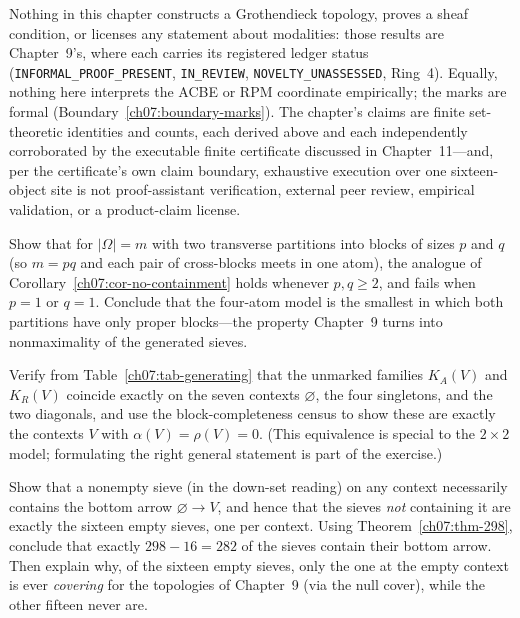 \begin{boundary}\label{ch07:boundary-scope}
Nothing in this chapter constructs a Grothendieck topology, proves a sheaf condition, or licenses any statement about modalities: those results are Chapter~9's, where each carries its registered ledger status (\texttt{INFORMAL\_PROOF\_PRESENT}, \texttt{IN\_REVIEW}, \texttt{NOVELTY\_UNASSESSED}, Ring~4). Equally, nothing here interprets the ACBE or RPM coordinate empirically; the marks are formal (Boundary~\ref{ch07:boundary-marks}). The chapter's claims are finite set-theoretic identities and counts, each derived above and each independently corroborated by the executable finite certificate discussed in Chapter~11---and, per the certificate's own claim boundary, exhaustive execution over one sixteen-object site is not proof-assistant verification, external peer review, empirical validation, or a product-claim license.
\end{boundary}

\begin{exercise}\label{ch07:ex-1}
Show that for $|\Omega|=m$ with two transverse partitions into blocks of sizes $p$ and $q$ (so $m=pq$ and each pair of cross-blocks meets in one atom), the analogue of Corollary~\ref{ch07:cor-no-containment} holds whenever $p,q\ge 2$, and fails when $p=1$ or $q=1$. Conclude that the four-atom model is the smallest in which both partitions have only proper blocks---the property Chapter~9 turns into nonmaximality of the generated sieves.
\end{exercise}

\begin{exercise}\label{ch07:ex-2}
Verify from Table~\ref{ch07:tab-generating} that the unmarked families $K_{A}(V)$ and $K_{R}(V)$ coincide exactly on the seven contexts $\varnothing$, the four singletons, and the two diagonals, and use the block-completeness census to show these are exactly the contexts $V$ with $\alpha(V)=\rho(V)=0$. (This equivalence is special to the $2\times 2$ model; formulating the right general statement is part of the exercise.)
\end{exercise}

\begin{exercise}\label{ch07:ex-3}
Show that a nonempty sieve (in the down-set reading) on any context necessarily contains the bottom arrow $\varnothing\to V$, and hence that the sieves \emph{not} containing it are exactly the sixteen empty sieves, one per context. Using Theorem~\ref{ch07:thm-298}, conclude that exactly $298-16=282$ of the sieves contain their bottom arrow. Then explain why, of the sixteen empty sieves, only the one at the empty context is ever \emph{covering} for the topologies of Chapter~9 (via the null cover), while the other fifteen never are.
\end{exercise}
